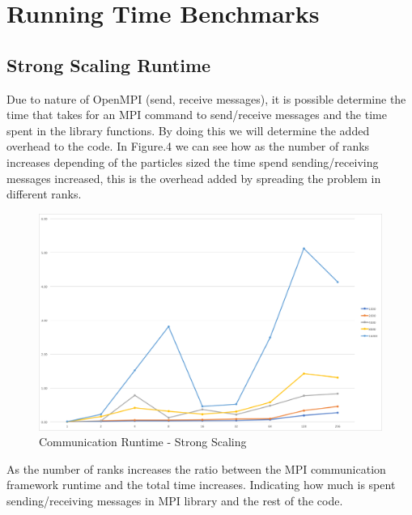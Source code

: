 \documentclass[12pt]{article} %
\begin{document}
\section{Running Time Benchmarks}

\subsection{Strong Scaling Runtime}

Due to nature of OpenMPI (send, receive messages), it is possible determine the time that takes for an MPI command to send/receive messages and the time spent in the library functions. By doing this we will determine the added overhead to the code. In Figure.4 we can see how as the number of ranks increases depending of the particles sized the time spend sending/receiving messages increased, this is the overhead added by  spreading the problem in different ranks.

\begin{figure}[htb]
\caption{Communication Runtime - Strong Scaling}\label{fig:benchmark05}
\centering
\includegraphics[width=\textwidth,keepaspectratio]{imgs/img04.png}
\end{figure}

\newpage

As the number of ranks increases the ratio between the MPI communication framework runtime and the total time increases. Indicating how much is spent sending/receiving messages in MPI library and the rest of the code.
\end{document}
